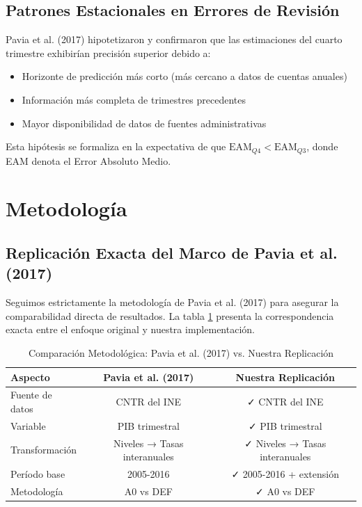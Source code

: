 \documentclass[12pt,a4paper]{article}
\begin{document}
\subsection{Patrones Estacionales en Errores de Revisión}

Pavia et al. (2017) hipotetizaron y confirmaron que las estimaciones del cuarto trimestre exhibirían precisión superior debido a:

\begin{itemize}
\item Horizonte de predicción más corto (más cercano a datos de cuentas anuales)
\item Información más completa de trimestres precedentes  
\item Mayor disponibilidad de datos de fuentes administrativas
\end{itemize}

Esta hipótesis se formaliza en la expectativa de que $\text{EAM}_{Q4} < \text{EAM}_{Q3}$, donde EAM denota el Error Absoluto Medio.

\section{Metodología}

\subsection{Replicación Exacta del Marco de Pavia et al. (2017)}

Seguimos estrictamente la metodología de Pavia et al. (2017) para asegurar la comparabilidad directa de resultados. La tabla \ref{tab:metodologia_comparacion} presenta la correspondencia exacta entre el enfoque original y nuestra implementación.

\begin{table}[h]
\centering
\caption{Comparación Metodológica: Pavia et al. (2017) vs. Nuestra Replicación}
\label{tab:metodologia_comparacion}
\begin{tabular}{lcc}
\toprule
\textbf{Aspecto} & \textbf{Pavia et al. (2017)} & \textbf{Nuestra Replicación} \\
\midrule
Fuente de datos & CNTR del INE & ✓ CNTR del INE \\
Variable & PIB trimestral & ✓ PIB trimestral \\
Transformación & Niveles → Tasas interanuales & ✓ Niveles → Tasas interanuales \\
Período base & 2005-2016 & ✓ 2005-2016 + extensión \\
Metodología & A0 vs DEF & ✓ A0 vs DEF \\
\bottomrule
\end{tabular}
\end{table}
\end{document}
